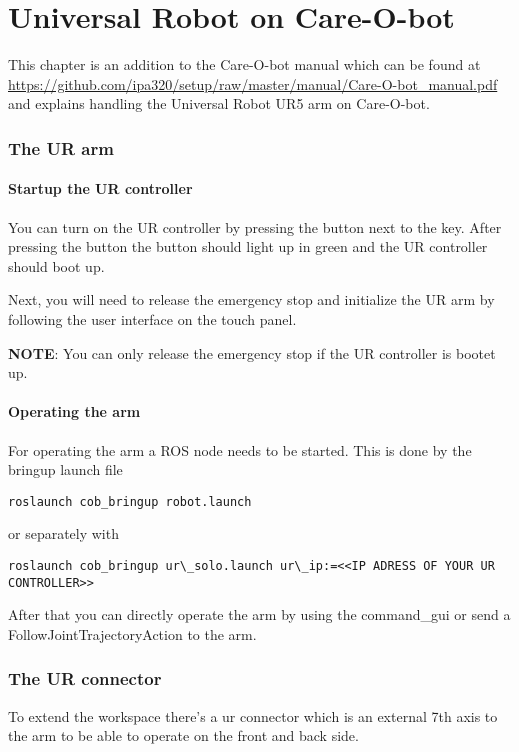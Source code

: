 \documentclass[12pt,twoside]{report}
\begin{document}
\chapter{Universal Robot on Care-O-bot}
This chapter is an addition to the Care-O-bot manual which can be found at \url{https://github.com/ipa320/setup/raw/master/manual/Care-O-bot_manual.pdf} and explains handling the Universal Robot UR5 arm on Care-O-bot.

\subsection{The UR arm}

\subsubsection{Startup the UR controller}
You can turn on the UR controller by pressing the button next to the key. After pressing the button the button should light up in green and the UR controller should boot up.

Next, you will need to release the emergency stop and initialize the UR arm by following the user interface on the touch panel.

\textbf{NOTE}: You can only release the emergency stop if the UR controller is bootet up.

\subsubsection{Operating the arm}
For operating the arm a ROS node needs to be started. This is done by the bringup launch file
\begin{lstlisting}
roslaunch cob_bringup robot.launch
\end{lstlisting}
or separately with 
\begin{lstlisting}
roslaunch cob_bringup ur\_solo.launch ur\_ip:=<<IP ADRESS OF YOUR UR CONTROLLER>>
\end{lstlisting}
After that you can directly operate the arm by using the command\_gui or send a FollowJointTrajectoryAction to the arm.

\subsection{The UR connector}
To extend the workspace there's a ur connector which is an external 7th axis to the arm to be able to operate on the front and back side.
\end{document}

